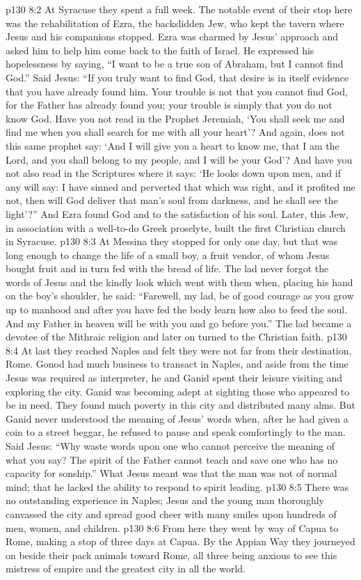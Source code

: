 \pc \vs p130 8:2 At Syracuse they spent a full week. The notable event of their stop here was the rehabilitation of Ezra, the backslidden Jew, who kept the tavern where Jesus and his companions stopped. Ezra was charmed by Jesus’ approach and asked him to help him come back to the faith of Israel. He expressed his hopelessness by saying, “I want to be a true son of Abraham, but I cannot find God.” Said Jesus: \textcolor{ubdarkred}{“If you truly want to find God, that desire is in itself evidence that you have already found him. Your trouble is not that you cannot find God, for the Father has already found you; your trouble is simply that you do not know God. Have you not read in the Prophet Jeremiah, ‘You shall seek me and find me when you shall search for me with all your heart’? And again, does not this same prophet say: ‘And I will give you a heart to know me, that I am the Lord, and you shall belong to my people, and I will be your God’? And have you not also read in the Scriptures where it says: ‘He looks down upon men, and if any will say: I have sinned and perverted that which was right, and it profited me not, then will God deliver that man’s soul from darkness, and he shall see the light’?”} And Ezra found God and to the satisfaction of his soul. Later, this Jew, in association with a well\hyp{}to\hyp{}do Greek proselyte, built the first Christian church in Syracuse.
\pc \vs p130 8:3 At Messina they stopped for only one day, but that was long enough to change the life of a small boy, a fruit vendor, of whom Jesus bought fruit and in turn fed with the bread of life. The lad never forgot the words of Jesus and the kindly look which went with them when, placing his hand on the boy’s shoulder, he said: \textcolor{ubdarkred}{“Farewell, my lad, be of good courage as you grow up to manhood and after you have fed the body learn how also to feed the soul. And my Father in heaven will be with you and go before you.”} The lad became a devotee of the Mithraic religion and later on turned to the Christian faith.
\pc \vs p130 8:4 At last they reached Naples and felt they were not far from their destination, Rome. Gonod had much business to transact in Naples, and aside from the time Jesus was required as interpreter, he and Ganid spent their leisure visiting and exploring the city. Ganid was becoming adept at sighting those who appeared to be in need. They found much poverty in this city and distributed many alms. But Ganid never understood the meaning of Jesus’ words when, after he had given a coin to a street beggar, he refused to pause and speak comfortingly to the man. Said Jesus: \textcolor{ubdarkred}{“Why waste words upon one who cannot perceive the meaning of what you say? The spirit of the Father cannot teach and save one who has no capacity for sonship.”} What Jesus meant was that the man was not of normal mind; that he lacked the ability to respond to spirit leading.
\vs p130 8:5 There was no outstanding experience in Naples; Jesus and the young man thoroughly canvassed the city and spread good cheer with many smiles upon hundreds of men, women, and children.
\vs p130 8:6 From here they went by way of Capua to Rome, making a stop of three days at Capua. By the Appian Way they journeyed on beside their pack animals toward Rome, all three being anxious to see this mistress of empire and the greatest city in all the world.

